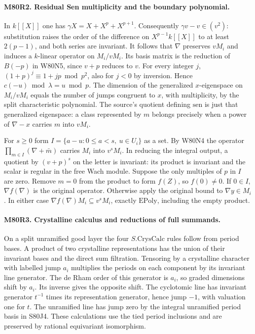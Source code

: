 \paragraph{M80R2. Residual Sen multiplicity and the boundary polynomial.}
In $k[[X]]$ one has $\gamma X=X+X^p+X^{p+1}$. Consequently
$\gamma v-v\in (v^2)$: substitution raises the order of the
difference on $X^{p-1}k[[X]]$ to at least $2(p-1)$, and both series
are invariant. It follows that $\nabla$ preserves $vM_i$ and induces
a $k$-linear operator on $M_i/vM_i$. Its basis matrix is the reduction
of $B(-p)$ in W80N5, since $v+p$ reduces to $v$. For every integer
$j$, $(1+p)^j\equiv1+jp\bmod p^2$, also for $j<0$ by inversion.
Hence $c(-u)\bmod\lambda=u\bmod p$. The dimension of the generalized
$x$-eigenspace on $M_i/vM_i$ equals the number of jumps congruent
to $x$, with multiplicity, by the split characteristic polynomial.
The source's quotient defining $\mathrm{sen}$ is just that generalized
eigenspace: a class represented by $m$ belongs precisely when a power
of $\nabla-x$ carries $m$ into $vM_i$.

For $s\ge0$ form $I=\{a-u:0\le a<s,\ u\in U_i\}$ as a set.
By W80N4 the operator $\prod_{m\in I}(\nabla+\bar m)$ carries
$M_i$ into $v^sM_i$. In reducing the integral output, a quotient by
$(v+p)^s$ on the letter is invariant: its product is invariant and
the scalar is regular in the free Wach module. Suppose the only
multiples of $p$ in $I$ are zero. Remove $m=0$ from the product to
form $f(Z)$, so $f(0)\ne0$. If $0\in I$, $\nabla f(\nabla)$ is
the original operator. Otherwise apply the original bound to
$\nabla y\in M_i$. In either case $\nabla f(\nabla)M_i\subseteq
v^s M_i$, exactly $\mathrm{EPoly}$, including the empty product.

\paragraph{M80R3. Crystalline calculus and reductions of full summands.}
On a split unramified good layer the four $S.\mathrm{CrysCalc}$
rules follow from period bases. A product of two crystalline
representations has the union of their invariant bases and the
direct sum filtration. Tensoring by a crystalline character with
labelled jump $a_i$ multiplies the periods on each component by its
invariant line generator. The de Rham order of this generator is
$a_i$, so graded dimensions shift by $a_i$. Its inverse gives the
opposite shift. The cyclotomic line has invariant generator $t^{-1}$
times its representation generator, hence jump $-1$, with valuation
one for $t$. The unramified line has jump zero by the integral
unramified period basis in S80J4. These calculations use the tied
period inclusions and are preserved by rational equivariant isomorphism.

